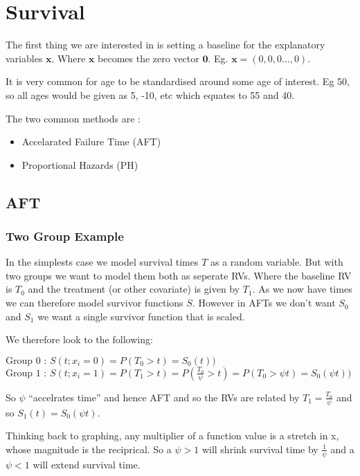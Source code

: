 \documentclass[
  letterpaper,
  DIV=11,
  numbers=noendperiod]{scrreprt}
\providecommand{\tightlist}{%
  \setlength{\itemsep}{0pt}\setlength{\parskip}{0pt}}\usepackage{longtable,booktabs,array}
\begin{document}
\hypertarget{survival-1}{%
\chapter{Survival}\label{survival-1}}

The first thing we are interested in is setting a baseline for the
explanatory variables \(\textbf{x}\). Where \(\textbf{x}\) becomes the
zero vector \(\textbf{0}\). Eg. \(\textbf{x} = (0,0,0...,0)\).

It is very common for age to be standardised around some age of
interest. Eg 50, so all ages would be given as 5, -10, etc which equates
to 55 and 40.

The two common methods are :

\begin{itemize}
\tightlist
\item
  Accelarated Failure Time (AFT)
\item
  Proportional Hazards (PH)
\end{itemize}

\hypertarget{aft}{%
\section{AFT}\label{aft}}

\hypertarget{two-group-example}{%
\subsection{Two Group Example}\label{two-group-example}}

In the simplests case we model survival times \(T\) as a random
variable. But with two groups we want to model them both as seperate
RVs. Where the baseline RV is \(T_0\) and the treatment (or other
covariate) is given by \(T_1\). As we now have times we can therefore
model survivor functions \(S\). However in AFTs we don't want \(S_0\)
and \(S_1\) we want a single survivor function that is scaled.

We therefore look to the following:

\(\text{Group 0 :   } S(t ; x_i=0) = P(T_0>t) = S_0(t))\)
\(\text{Group 1 :   } S(t ; x_i=1) = P(T_1>t) = P(\frac{T_0}{\psi}> t) = P(T_0>\psi t) = S_0(\psi t))\)

So \(\psi\) ``accelrates time'' and hence AFT and so the RVs are related
by \(T_1 = \frac{T_0}{\psi}\) and so \(S_1(t) = S_0(\psi t)\).

Thinking back to graphing, any multiplier of a function value is a
stretch in x, whose magnitude is the reciprical. So a \(\psi >1\) will
shrink survival time by \(\frac{1}{\psi}\) and a \(\psi <1\) will extend
survival time.
\end{document}

